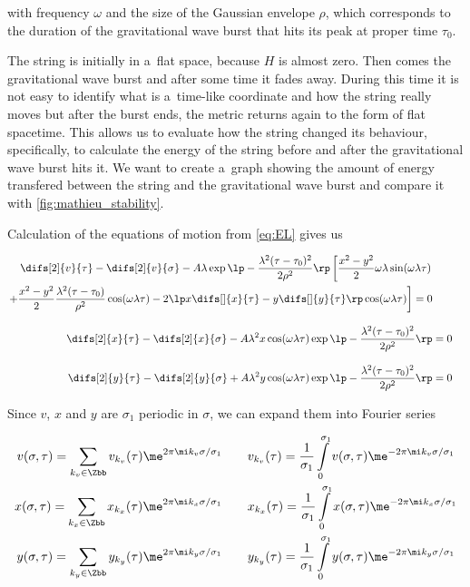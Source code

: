 \noindent
with frequency $\omega$ and the size of the Gaussian envelope $\rho$, which corresponds to the duration of the gravitational wave burst that hits its peak at proper time $\tau_0$. 

The string is initially in a~flat space, because $H$ is almost zero. Then comes the gravitational wave burst and after some time it fades away. During this time it is not easy to identify what is a~time-like coordinate and how the string really moves but after the burst ends, the metric returns again to the form of flat spacetime. This allows us to evaluate how the string changed its behaviour, specifically, to calculate the energy of the string before and after the gravitational wave burst hits it. We want to create a~graph showing the amount of energy transfered between the string and the gravitational wave burst and compare it with \cref{fig:mathieu_stability}. 

Calculation of the equations of motion from \cref{eq:EL} gives us


\begin{align}
    \begin{aligned}
        \difs[2]{v}{\tau} - \difs[2]{v}{\sigma} 
        - A \lambda \exp \lp -\frac{\lambda^2(\tau-\tau_0)^2}{2 \rho^2} \rp 
        \left[ \frac{ x^2 - y^2}{2} \omega \lambda \sin(\omega \lambda \tau) \right. \\
        \left. + \frac{ x^2 - y^2}{2} \frac{\lambda^2 (\tau - \tau_0)}{ \rho^2}\cos(\omega \lambda \tau)
        - 2 \lp x \difs[]{x}{\tau} - y \difs[]{y}{\tau} \rp \cos(\omega \lambda \tau) \right] = 0
        \end{aligned}        \\[3mm]
        \difs[2]{x}{\tau} - \difs[2]{x}{\sigma} - A \lambda^2 x \cos(\omega \lambda \tau)\exp \lp -\frac{\lambda^2(\tau-\tau_0)^2}{2 \rho^2} \rp & = 0 \\[3mm]
        \difs[2]{y}{\tau} - \difs[2]{y}{\sigma} + A \lambda^2 y \cos(\omega \lambda \tau)\exp \lp -\frac{\lambda^2(\tau-\tau_0)^2}{2 \rho^2} \rp & = 0
\end{align}

\noindent
Since $v$, $x$ and $y$ are $\sigma_1$ periodic in $\sigma$, we can expand them into Fourier series

\begin{align}
    v(\sigma, \tau) = \sum\limits_{k_v \in \Zbb} v_{k_v}(\tau) \me^{2 \pi \mi k_v \sigma/\sigma_1}
    \qquad & v_{k_v}(\tau) = \frac{1}{\sigma_1} \int\limits_{0}^{\sigma_1} v(\sigma, \tau) \me^{-2 \pi \mi k_v \sigma /\sigma_1} \\
    x(\sigma, \tau) = \sum\limits_{k_x \in \Zbb} x_{k_x}(\tau) \me^{2 \pi \mi k_x \sigma/\sigma_1}
    \qquad & x_{k_x}(\tau) = \frac{1}{\sigma_1} \int\limits_{0}^{\sigma_1} x(\sigma, \tau) \me^{-2 \pi \mi k_x \sigma /\sigma_1} \\
    y(\sigma, \tau) = \sum\limits_{k_y \in \Zbb} y_{k_y}(\tau) \me^{2 \pi \mi k_y \sigma/\sigma_1} 
    \qquad & y_{k_y}(\tau) = \frac{1}{\sigma_1} \int\limits_{0}^{\sigma_1} y(\sigma, \tau) \me^{-2 \pi \mi k_y \sigma /\sigma_1}
\end{align}

